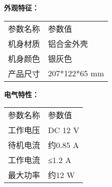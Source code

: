 \noindent\xiaosi\textbf{外观特征：}
\vspace{0.3cm}
\song
\begin{table}[H]
{}
\begin{tabular}{m{6.5cm}|m{6.5cm}}
\rowcolor{myblue}
\color{white}参数名称& \color{white}参数值\\\arrayrulecolor{tabcolor}\midrule[1.2pt]
机身材质& 铝合金外壳\\\arrayrulecolor{tabcolor}\midrule[1.2pt]
机身颜色& 银灰色\\\arrayrulecolor{tabcolor}\midrule[1.2pt]
产品尺寸& 207*122*65 mm\\
\end{tabular}
\end{table}


\newpage
\noindent\xiaosi\textbf{电气特性：}
\vspace{0.3cm}
\song
\begin{table}[H]
{}
\begin{tabular}{m{6.5cm}|m{6.5cm}}
\rowcolor{myblue}
\color{white}参数名称& \color{white}参数值\\\arrayrulecolor{tabcolor}\midrule[1.2pt]
工作电压& DC 12 V\\\arrayrulecolor{tabcolor}\midrule[1.2pt]
待机电流& 约0.85 A\\\arrayrulecolor{tabcolor}\midrule[1.2pt]
工作电流& ≤1.2 A\\\arrayrulecolor{tabcolor}\midrule[1.2pt]
最大功率& 约12 W\\
\end{tabular}
\end{table}


